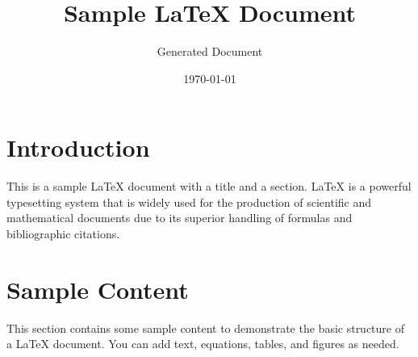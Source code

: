 \documentclass{article}
\title{Sample LaTeX Document}
\author{Generated Document}
\date{\today}
\begin{document}
\maketitle

\section{Introduction}
This is a sample LaTeX document with a title and a section. LaTeX is a powerful typesetting system that is widely used for the production of scientific and mathematical documents due to its superior handling of formulas and bibliographic citations.

\section{Sample Content}
This section contains some sample content to demonstrate the basic structure of a LaTeX document. You can add text, equations, tables, and figures as needed.
\end{document}
